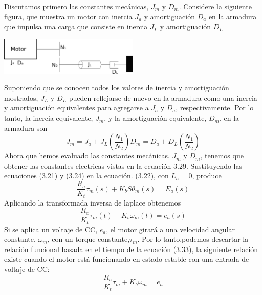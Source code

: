 Discutamos primero las constantes mecánicas, $J_m$ y $D_m$. Considere la siguiente figura, que muestra un motor con inercia $J_a$
y amortiguación $D_a$ en la armadura que impulsa una carga que consiste en inercia $J_L$ y amortiguación $D_L$
\begin{center}
	\includegraphics[width=0.5\textwidth]{Contenido/Cuerpo/Capitulo3/Fig18.eps}
	\label{fig:ModeloMat:Fig1}
\end{center}
Suponiendo que se conocen todos los valores de inercia y amortiguación mostrados, $J_L$ y $D_L$ pueden reflejarse de nuevo en la
armadura como una inercia y amortiguación equivalentes para agregarse a $J_a$ y $D_a$, respectivamente. Por lo tanto, la inercia
equivalente, $J_m$, y la amortiguación equivalente, $D_m$, en la armadura son
\begin{subequations}
	\begin{equation}
		J_m = J_a + J_L \left( \frac{N_1}{N_2} \right)
	\end{equation}
	\begin{equation}
		D_m = D_a + D_L\left( \frac{N_1}{N_2} \right)
	\end{equation}
\end{subequations}
Ahora que hemos evaluado las constantes mecánicas, $J_m$ y $D_m$, tenemos que obtener las constantes electricas vistas en la
ecuación 3.29. Sustituyendo las ecuaciones (3.21) y (3.24) en la ecuación. (3.22), con $L_a = 0$, produce
\begin{equation}
	\frac{R_a}{K_t} \tau_m (s) + K_bS\theta_m(s) = E_a(s)
\end{equation}
Aplicando la transformada inversa de laplace obtenemos
\begin{equation}
	\frac{R_a}{K_t} \tau_m (t) + K_b\omega_m(t) = e_a(s)
\end{equation}
Si se aplica un voltaje de CC, $e_a$, el motor girará a una velocidad angular constante, $\omega_m$, con un torque constante,$\tau_m$.
Por lo tanto,podemos descartar la relación funcional basada en el tiempo de la ecuación (3.33), la siguiente relación existe
cuando el motor está funcionando en estado estable con una entrada de voltaje de CC:
\begin{equation}
	\frac{R_a}{K_t} \tau_m + K_b\omega_m = e_a
\end{equation}
